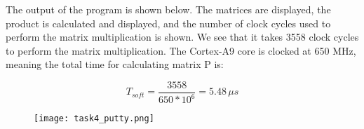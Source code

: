 \documentclass[../main.tex]{subfiles}
\begin{document}
\newpage

The output of the program is shown below. The matrices are displayed, the product is calculated and displayed, and the number of clock cycles used to perform the matrix multiplication is shown. We see that it takes 3558 clock cycles to perform the matrix multiplication. The Cortex-A9 core is clocked at 650 MHz, meaning the total time for calculating matrix P is:

$$ T_{soft} = \frac{3558}{650 * 10^6} = 5.48 \, \si{\mu s} $$

\begin{figure}[h]
    \centering
    \texttt{[image: task4\_putty.png]}
\end{figure}
\end{document}
